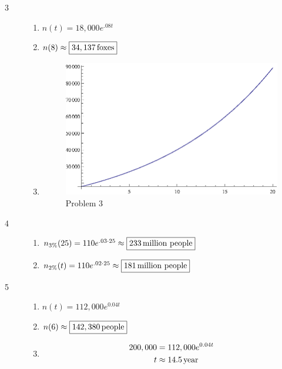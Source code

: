 \documentclass{exam}
\begin{document}
\begin{description}
      \item[3]
        \begin{enumerate}[a]
          \item $\boxed{ n(t) = 18,000 e^{.08t} }$

          \item $n(8) \approx \boxed{ \unit[34,137]{foxes}} $

          \item
            \begin{figure}[H]
              \centering
              \includegraphics{problem3.eps}
              \caption{Problem 3}
            \end{figure}
        \end{enumerate}

      \item[4] 
        \begin{enumerate}[a]
          \item $n_{3\%}(25) = 110 e^{.03 \cdot 25} \approx \boxed{ \unit[233]{million \ people}}$

          \item $n_{2\%}(t) = 110 e^{.02\cdot 25} \approx \boxed{ \unit[181]{million \ people}}$
        \end{enumerate}

      \item[5] 
        \begin{enumerate}[a]
          \item $\boxed{ n(t) = 112,000 e^{0.04t} }$

          \item $n(6) \approx \boxed{\unit[142,380]{people}}$

          \item 
            \begin{align*}
              200,000 & = 112,000 e^{0.04t} \\
              t       & \approx \unit[14.5]{year} \\
            \end{align*}


\end{enumerate}
\end{description}
\end{document}
